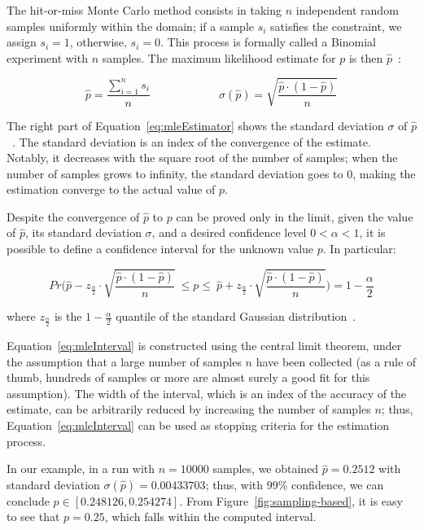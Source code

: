 The hit-or-miss Monte Carlo method consists in taking $n$ independent random samples uniformly within the domain; if a sample $s_i$ satisfies the constraint, we assign $s_i=1$, otherwise, $s_i=0$. This process is formally called a Binomial experiment with $n$ samples. The maximum likelihood estimate for $p$ is then $\hat{p}$~\cite{pestman1998mathematical}:

\begin{equation}\label{eq:mleEstimator}
	\hat{p} = \frac{\sum_{i=1}^n s_i}{n} \qquad\qquad\qquad \sigma(\hat{p}) = \sqrt{\frac{\hat{p} \cdot (1-\hat{p})}{n}}
\end{equation}
 
 
The right part of Equation~\eqref{eq:mleEstimator} shows the standard deviation $\sigma$ of $\hat{p}$~\cite{pestman1998mathematical}. The standard deviation is an index of the convergence of the estimate. Notably, it decreases with the square root of the number of samples; when the number of samples grows to infinity, the standard deviation goes to $0$, making the estimation converge to the actual value of $p$.

Despite the convergence of $\hat{p}$ to $p$ can be proved only in the limit, given the value of $\hat{p}$, its standard deviation $\sigma$, and a desired confidence level $0<\alpha<1$, it is possible to define a confidence interval for the unknown value $p$. In particular:

\begin{equation}\label{eq:mleInterval}
	Pr\Big( \hat{p} - z_{\frac{\alpha}{2}} \cdot \sqrt{\frac{\hat{p} \cdot (1-\hat{p})}{n}} \ \leq p \leq \ \hat{p} + z_{\frac{\alpha}{2}} \cdot \sqrt{\frac{\hat{p} \cdot (1-\hat{p})}{n}} \Big) = 1-\frac{\alpha}{2}
\end{equation}

\noindent where $z_{\frac{\alpha}{2}}$ is the $1-\frac{\alpha}{2}$ quantile of the standard Gaussian distribution~\cite{pestman1998mathematical}.

Equation~\eqref{eq:mleInterval} is constructed using the central limit theorem, under the assumption that a large number of samples $n$ have been collected (as a rule of thumb, hundreds of samples or more are almost surely a good fit for this assumption). The width of the interval, which is an index of the accuracy of the estimate, can be arbitrarily reduced by increasing the number of samples $n$; thus, Equation~\eqref{eq:mleInterval} can be used as stopping criteria for the estimation process.

In our example, in a run with $n=10000$ samples, we obtained $\hat{p}= 0.2512$ with standard deviation $\sigma(\hat{p})=0.00433703$; thus, with $99\%$ confidence, we can conclude $p \in [0.248126, 0.254274]$. From Figure~\ref{fig:sampling-based}, it is easy to see that $p=0.25$, which falls within the computed interval.

